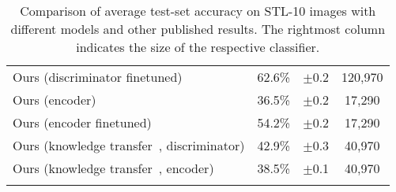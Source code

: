 \documentclass[a4paper,12pt]{report}
\begin{document}
\begin{table}[ht!]
\begin{tabular}{l c c|c}
Ours (discriminator finetuned) & 62.6\%  & $\pm$0.2 & 120,970 \\ %
Ours (encoder) & 36.5\%  & $\pm$0.2 & 17,290 \\ %
Ours (encoder finetuned) & 54.2\% & $\pm$0.2 & 17,290 \\ %
\hline
Ours (knowledge transfer~\cite{KnowledgeTransfer}, discriminator) & 42.9\% & $\pm$0.3 & 40,970 \\ %
Ours (knowledge transfer~\cite{KnowledgeTransfer}, encoder) & 38.5\% & $\pm$0.1 & 40,970 \\ %
\Xhline{0.8pt}
\end{tabular}
\caption{Comparison of average test-set accuracy on STL-10 images with different models and other published results. The rightmost column indicates the size of the respective classifier.} \label{tab:comparison_stl10}
\end{table}
\end{document}
